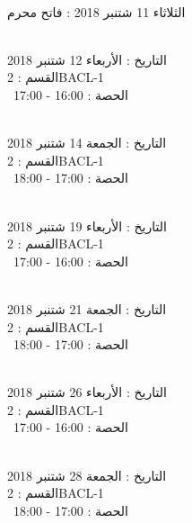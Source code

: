 \documentclass[14pt a4paper twocolumn]{book}
\begin{document}
\par
\noindent\makebox[\linewidth]{\rule{\paperwidth}{0.4pt}}
 \\
الثلاثاء 11 شتنبر 2018 :   فاتح محرم
\par
\noindent\makebox[\linewidth]{\rule{\paperwidth}{0.4pt}}
 \\
التاريخ : الأربعاء 12 شتنبر 2018 \\
القسم : 2BACL-1 \\
 \  
الحصة : 16:00 - 17:00 \\
\par
\noindent\makebox[\linewidth]{\rule{\paperwidth}{0.4pt}}
 \\
التاريخ : الجمعة 14 شتنبر 2018 \\
القسم : 2BACL-1 \\
 \  
الحصة : 17:00 - 18:00 \\
\par
\noindent\makebox[\linewidth]{\rule{\paperwidth}{0.4pt}}
 \\
التاريخ : الأربعاء 19 شتنبر 2018 \\
القسم : 2BACL-1 \\
 \  
الحصة : 16:00 - 17:00 \\
\par
\noindent\makebox[\linewidth]{\rule{\paperwidth}{0.4pt}}
 \\
التاريخ : الجمعة 21 شتنبر 2018 \\
القسم : 2BACL-1 \\
 \  
الحصة : 17:00 - 18:00 \\
\par
\noindent\makebox[\linewidth]{\rule{\paperwidth}{0.4pt}}
 \\
التاريخ : الأربعاء 26 شتنبر 2018 \\
القسم : 2BACL-1 \\
 \  
الحصة : 16:00 - 17:00 \\
\par
\noindent\makebox[\linewidth]{\rule{\paperwidth}{0.4pt}}
 \\
التاريخ : الجمعة 28 شتنبر 2018 \\
القسم : 2BACL-1 \\
 \  
الحصة : 17:00 - 18:00 \\
\par
\end{document}
